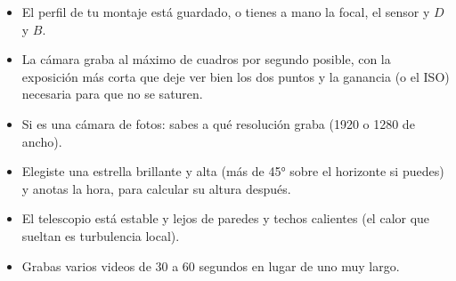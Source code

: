 \begin{pasos}
\begin{itemize}[label=$\square$,leftmargin=1.4em]
\item El perfil de tu montaje está guardado, o tienes a mano la focal, el sensor y $D$ y $B$.
\item La cámara graba al máximo de cuadros por segundo posible, con la exposición más corta que deje ver bien los dos
puntos y la ganancia (o el ISO) necesaria para que no se saturen.
\item Si es una cámara de fotos: sabes a qué resolución graba (1920 o 1280 de ancho).
\item Elegiste una estrella brillante y alta (más de 45° sobre el horizonte si puedes) y anotas la hora, para calcular su
altura después.
\item El telescopio está estable y lejos de paredes y techos calientes (el calor que sueltan es turbulencia local).
\item Grabas varios videos de 30 a 60 segundos en lugar de uno muy largo.
\end{itemize}
\end{pasos}
